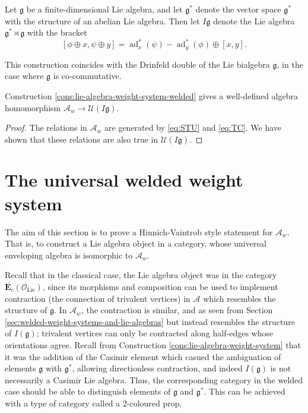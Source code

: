 \begin{definition}
	Let \(\mathfrak{g}\) be a finite-dimensional Lie algebra, and let \(\mathfrak{g}^{\ast}\) denote the vector space \(\mathfrak{g}^{\ast}\) with the structure of an abelian Lie algebra. Then let \(I\mathfrak{g}\) denote the Lie algebra \(\mathfrak{g}^{\ast} \rtimes \mathfrak{g}\) with the bracket
	\[[\phi \oplus x, \psi \oplus y] = \operatorname{ad}^{\ast}_{x}(\psi) - \operatorname{ad}^{\ast}_{y}(\phi) \oplus [x, y].\]
\end{definition}
\begin{remark}
	This construction coincides with the Drinfeld double \cite{quantum-groups} of the Lie bialgebra \(\mathfrak{g}\), in the case where \(\mathfrak{g}\) is co-commutative.
\end{remark}

\begin{proposition}
	Construction \ref{cons:lie-algebra-weight-system-welded} gives a well-defined algebra homomorphism \(\mathcal{A}_{w} \to \mathcal{U}(I\mathfrak{g})\).
\end{proposition}

\begin{proof}
	The relations in \(\mathcal{A}_{w}\) are generated by \ref{eq:STU} and \ref{eq:TC}. We have shown that these relations are also true in \(\mathcal{U}(I\mathfrak{g})\).
\end{proof}

\section{The universal welded weight system}

The aim of this section is to prove a Hinnich-Vaintrob style statement for \(\mathcal{A}_{w}\). That is, to construct a Lie algebra object in a category, whose universal enveloping algebra is isomorphic to \(\mathcal{A}_{w}\).

Recall that in the classical case, the Lie algebra object was in the category \(\mathbf{E}_{c}(\mathcal{O}_{\text{Lie}})\), since its morphisms and composition can be used to implement contraction (the connection of trivalent vertices) in \(\mathcal{A}\) which resembles the structure of \(\mathfrak{g}\). In \(\mathcal{A}_{w}\), the contraction is similar, and as seen from Section \ref{sec:welded-weight-systems-and-lie-algebras} but instead resembles the structure of \(I(\mathfrak{g})\); trivalent vertices can only be contracted along half-edges whose orientations agree. Recall from Construction \ref{cons:lie-algebra-weight-system} that it was the addition of the Casimir element which casued the ambiguation of elements \(\mathfrak{g}\) with \(\mathfrak{g}^{\ast}\), allowing directionless contraction, and indeed \(I(\mathfrak{g})\) is not necessarily a Casimir Lie algebra. Thus, the corresponding category in the welded case should be able to distinguish elements of \(\mathfrak{g}\) and \(\mathfrak{g}^{\ast}\). This can be achieved with a type of category called a \(2\)-coloured prop.


